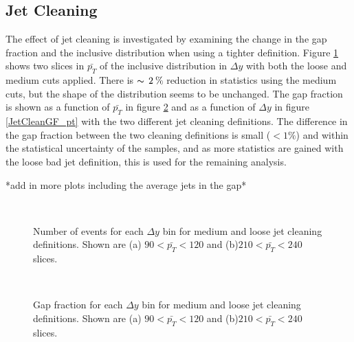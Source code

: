 \subsection{Jet Cleaning}
\label{sec:GBJ1:Cleaning}

The effect of jet cleaning is investigated by examining the change in the gap fraction and the inclusive distribution when using a tighter definition. 
Figure \ref{JetCleanIncl_dy} shows two slices in $\bar{p_T}$ of the inclusive distribution in $\Delta y$ with both the loose and medium cuts applied. 
There is $\thicksim\, 2\: \%\: $reduction in statistics using the medium cuts, but the shape of the distribution seems to be unchanged.  
The gap fraction is shown as a function of $\bar{p_T}$ in figure \ref{JetCleanGF_dy} and as a function of $\Delta y$ in figure \ref{JetCleanGF_pt} with the two different jet cleaning definitions. 
The difference in the gap fraction between the two cleaning definitions is small ($<1\%$) and within the statistical uncertainty of the samples, and as more statistics are gained with the loose bad jet definition, this is used for the remaining analysis. 

*add in more plots including the average jets in the gap*

\begin{figure}
\centering
\mbox{
              \quad
              \quad
                              }
\caption[Effect of jet cleaning on the inclusive distribution for $\bar{p_T}$]{Number of events for each $\Delta y$ bin for medium and loose jet cleaning definitions. Shown are (a) $90<\bar{p_T}<120$ and (b)$210<\bar{p_T}<240$ slices.\label{JetCleanIncl_dy}}
\end{figure}

\begin{figure}
\centering
\mbox{
              \quad
              \quad
                              }
\caption[Effect of jet cleaning on the gap fraction for $\bar{p_T}$]{Gap fraction for each $\Delta y$ bin for medium and loose jet cleaning definitions. Shown are (a) $90<\bar{p_T}<120$ and (b)$210<\bar{p_T}<240$ slices.\label{JetCleanGF_dy}}
\end{figure}


